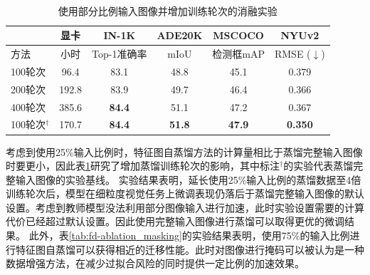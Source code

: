 \begin{table}
        \centering
        \caption{使用部分比例输入图像并增加训练轮次的消融实验}
    \
        \begin{tabular}{lccccc}
            \toprule
               & 显卡 & IN-1K & ADE20K & MSCOCO & NYUv2 \\
                \midrule
               方法 & 小时 &  Top-1准确率   &  mIoU  & 检测框mAP & RMSE\scriptsize{ ($\downarrow$)}\\
              \midrule
              100轮次 & 96.4 & 83.1 & 48.8 & 45.1&  0.379 \\
              200轮次 & 192.8 & 83.9 & 49.7 & 46.4& 0.366 \\
              400轮次 & 385.6 & \textbf{84.4} & 51.1 & 47.2&  0.367 \\
              100轮次$^{\dag}$ & 170.7 & \textbf{84.4} & \textbf{51.8} & \textbf{47.9} & \textbf{0.350} \\
            \bottomrule
        \end{tabular}
        \label{tab:fd-ablate_longer_maskinput}
\end{table}

考虑到使用25\%输入比例时，特征图自蒸馏方法的计算量相比于蒸馏完整输入图像时要更小，因此表\ref{tab:fd-ablate_longer_maskinput}研究了增加蒸馏训练轮次的影响，其中标注$^{\dag}$的实验代表蒸馏完整输入图像的实验基线。
实验结果表明，延长使用25\%输入比例的蒸馏数据至4倍训练轮次后，模型在细粒度视觉任务上微调表现仍落后于蒸馏完整输入图像的默认设置。考虑到教师模型没法利用部分图像输入进行加速，此时实验设置需要的计算代价已经超过默认设置。因此使用完整输入图像进行蒸馏可以取得更优的微调结果。
此外，表\ref{tab:fd-ablation_masking}的实验结果表明，使用75\%的输入比例进行特征图自蒸馏可以获得相近的迁移性能。此时对图像进行掩码可以被认为是一种数据增强方法，在减少过拟合风险的同时提供一定比例的加速效果。


